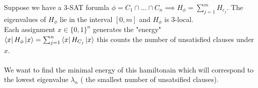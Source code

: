 \documentclass{article}
\begin{document}
               Suppose we have a 3-SAT forumla $\phi = C_1 \cap ... \cap C_n \implies H_{\phi} = \sum_{j=1}^m H_{c_j}$. The eigenvalues of $H_{\phi}$ lie in the interval $[0,m]$ and $H_{\phi}$ is 3-local.\\
                       Each assignment $x \in \{0,1\}^n$ generates the "energy"\\
                       $\bra{x} H_{\phi} \ket{x} = \sum_{j=1}^n \bra{x} H_{C_j} \ket{x}$ this counts the number of unsatisfied clauses under $x$.\\\\
                       We want to find the minimal energy of this hamiltonain which will correspond to the lowest eigenvalue $\lambda_n$ ( the smallest number of unsatsified clauses).
\end{document}

